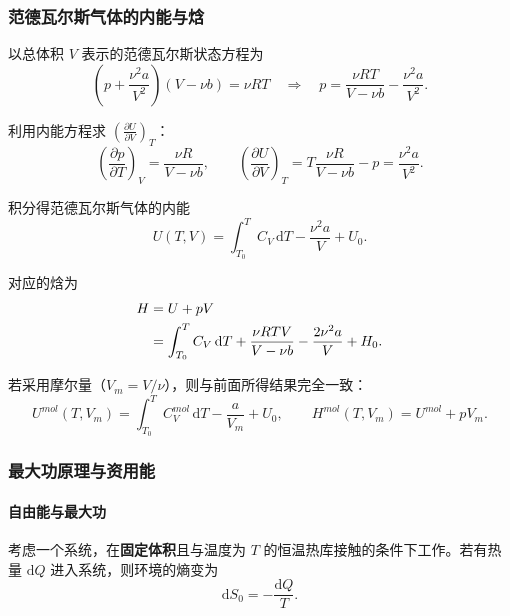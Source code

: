 \documentclass[UTF8]{ctexart}
\theoremstyle{definition}
\begin{document}
\subsubsection*{范德瓦尔斯气体的内能与焓}

以总体积 $V$ 表示的范德瓦尔斯状态方程为
\begin{equation}
\left(p + \frac{\nu^2 a}{V^2}\right)(V - \nu b) = \nu RT
\quad\Rightarrow\quad
p = \frac{\nu RT}{V-\nu b} - \frac{\nu^2 a}{V^2}.
\end{equation}

利用内能方程求 $\displaystyle\left(\frac{\partial U}{\partial V}\right)_T$：
\begin{equation}
\left(\frac{\partial p}{\partial T}\right)_V = \frac{\nu R}{V-\nu b},
\qquad
\left(\frac{\partial U}{\partial V}\right)_T = T\frac{\nu R}{V-\nu b} - p
= \frac{\nu^2 a}{V^2}.
\end{equation}

积分得范德瓦尔斯气体的内能
\begin{equation}
U(T,V) = \int_{T_0}^{T} C_V\,\mathrm{d}T - \frac{\nu^2 a}{V} + U_0.
\end{equation}

对应的焓为
\begin{align}
H &= U + pV \notag\\
&= \int_{T_0}^{T} C_V\,\mathrm{d}T + \frac{\nu RTV}{V-\nu b} - \frac{2\nu^2 a}{V} + H_0.
\end{align}

若采用摩尔量（$V_m=V/\nu$），则与前面所得结果完全一致：
\begin{equation}
U^{mol}(T,V_m) = \int_{T_0}^{T} C_V^{mol}\,\mathrm{d}T - \frac{a}{V_m} + U_0,
\qquad
H^{mol}(T,V_m) = U^{mol} + pV_m.
\end{equation}


\subsubsection*{最大功原理与资用能}

\paragraph{自由能与最大功}

考虑一个系统，在\textbf{固定体积}且与温度为 $T$ 的恒温热库接触的条件下工作。若有热量 $\mathrm{d}Q$ 进入系统，则环境的熵变为
\begin{equation}
\mathrm{d}S_0 = -\frac{\mathrm{d}Q}{T}.
\end{equation}
\end{document}
